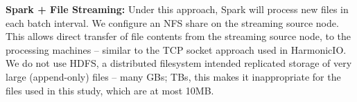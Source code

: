 \documentclass[conference]{IEEEtran}
\begin{document}
\textbf{Spark + File Streaming:} Under this approach, Spark will process new files in each batch interval. %
We configure an NFS share on the streaming source node. This allows direct transfer of file contents from the streaming source node, to the processing machines -- similar to the TCP socket approach used in HarmonicIO. 
We do not use HDFS, a distributed filesystem intended replicated storage of very large (append-only) files -- many GBs; TBs, this makes it inappropriate for the files used in this study, which are at most 10MB. 

\end{document}
